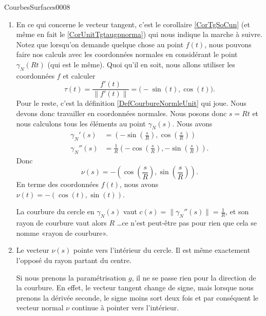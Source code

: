 \begin{corrige}{CourbesSurfaces0008}
\begin{enumerate}
		\item	
			En ce qui concerne le vecteur tangent, c'est le corollaire \ref{CorTgSoCun} (et même en fait le \ref{CorUnitTgtaugpnorma}) qui nous indique la marche à suivre. Notez que lorsqu'on demande quelque chose au point $f(t)$, nous pouvons faire nos calculs avec les coordonnées normales en considérant le point $\gamma_N(Rt)$ (qui est le même). Quoi qu'il en soit, nous allons utiliser les coordonnées $f$ et calculer 
			\begin{equation}
				\tau(t)=\frac{ f'(t) }{ \| f'(t) \| }=\big( -\sin(t),\cos(t) \big).
			\end{equation}
			Pour le reste, c'est la définition \ref{DefCourbureNormleUnit} qui joue. Nous devons donc travailler en coordonnées normales. Nous posons donc $s=Rt$ et nous calculons tous les éléments au point $\gamma_N(s)$. Nous avons
			\begin{subequations}
				\begin{align}
					\gamma_N'(s)&=\left( -\sin(\frac{ s }{ R }),\cos(\frac{ s }{ R }) \right)\\
					\gamma_N''(s)&=\frac{1}{ R }\left( -\cos(\frac{ s }{ R }),-\sin(\frac{ s }{ R }) \right).
				\end{align}
			\end{subequations}
			Donc
			\begin{equation}
				\nu(s)=-\left( \cos(\frac{ s }{ R }),\sin(\frac{ s }{ R }) \right).
			\end{equation}
			En terme des coordonnées $f(t)$, nous avons $\nu(t)=-\left( \cos(t),\sin(t) \right)$.
			
			La courbure du cercle en $\gamma_N(s)$ vaut $c(s)=\| \gamma_N''(s) \|=\frac{1}{ R }$, et son rayon de courbure vaut alors $R$ \ldots ce n'est peut-être pas pour rien que cela se nomme «rayon de courbure».

		\item
			Le vecteur $\nu(s)$ pointe vers l'intérieur du cercle. Il est même exactement l'opposé du rayon partant du centre.

			Si nous prenons la paramétrisation $g$, il ne se passe rien pour la direction de la courbure. En effet, le vecteur tangent change de signe, mais lorsque nous prenons la dérivée seconde, le signe moins sort deux fois et par conséquent le vecteur normal $\nu$ continue à pointer vers l'intérieur.

	\end{enumerate}

\end{corrige}
